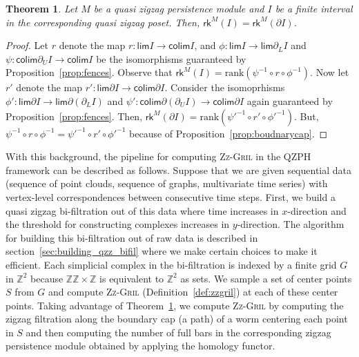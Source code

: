 \documentclass{article}
\newcommand{\zzgril}{\textsc{Zz-Gril}}
\newcommand{\RKG}{\mathsf{rk}}
\newcommand{\zz}{\mathbb{ZZ}}
\newcommand{\z}{\mathbb{Z}}
\renewcommand{\varprojlim}{\mathsf{lim}}
\renewcommand{\varinjlim}{\mathsf{colim}}
\theoremstyle{plain}
\newtheorem{theorem}{Theorem}[section]
\theoremstyle{definition}
\theoremstyle{remark}
\begin{document}
\begin{theorem}\label{thm:compute_zzgril}
    Let $M$ be a quasi zigzag persistence module and
    $I$ be a finite interval in the corresponding quasi zigzag poset. Then, 
    $\RKG^M(I)=\RKG^{M}(\partial I)$.
\end{theorem}
\begin{proof}
   Let $r$ denote the map $r: \varprojlim{I}\rightarrow \varinjlim{I}$, and
   $\phi: \varprojlim{I}\rightarrow \varprojlim{\partial_L I}$ and
   $\psi: \varinjlim{\partial_U I}\rightarrow \varinjlim{I}$ be the isomorphisms guaranteed by Proposition~\ref{prop:fences}. Observe that $\RKG^M(I)= \mathrm{rank}(\psi^{-1}\circ r \circ \phi^{-1})$. Now let $r'$ denote the map
   $r': \varprojlim{\partial I}\rightarrow \varinjlim{\partial I}$. Consider the isomoprhisms 
   $\phi': \varprojlim{\partial I}\rightarrow \varprojlim{\partial (\partial_L I)}$ and
   $\psi': \varinjlim{\partial(\partial_U I)}\rightarrow \varinjlim{\partial I}$ again guaranteed by Proposition~\ref{prop:fences}. Then,
   $\RKG^M(\partial I)=\mathrm{rank}(\psi'^{-1}\circ r'\circ \phi'^{-1})$. But,
   $\psi^{-1}\circ r \circ \phi^{-1}=\psi'^{-1}\circ r'\circ \phi'^{-1}$ because of
   Proposition~\ref{prop:boudnarycap}.
\end{proof}
With this background, the pipeline for computing \zzgril{} in the QZPH framework
can be described as follows.
Suppose that we are given sequential data (sequence of point clouds, sequence of graphs, multivariate time series) with vertex-level correspondences between consecutive time steps. First, we build a quasi zigzag bi-filtration out of this data where time
increases in $x$-direction and the threshold for constructing complexes increases
in $y$-direction. The algorithm for building this bi-filtration out of raw data
is described in section~\ref{sec:building_qzz_bifil}
where we make certain choices to make it efficient.
Each simplicial complex in the bi-filtration is indexed by a finite grid $G$ in $\z^2$ because $\zz \times \z$ is equivalent to $\z^2$ as sets. 
We sample a set of center points $S$ from $G$ and compute \zzgril{} (Definition~\ref{def:zzgril}) at each of these center points. Taking advantage of Theorem~\ref{thm:compute_zzgril}, we compute \zzgril{} by computing
the zigzag filtration along the boundary cap (a path) of a worm centering each point
in $S$ and then computing the number of full bars in the corresponding zigzag persistence module obtained by applying the homology functor.
\end{document}
